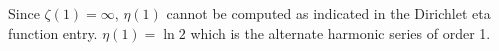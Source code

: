 \documentclass[12pt]{article}
\begin{document}
 Since $\zeta (1)= \infty $, $ \eta (1) $ cannot be computed as indicated in the Dirichlet eta function entry. $ \eta(1) =\ln 2 $ which is the alternate harmonic series of order 1.
\end{document}
